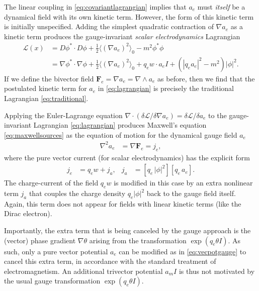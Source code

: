 \documentclass[1p,sort&compress]{elsarticle}
\numberwithin{equation}{section}
\newcommand{\bv}[1]{\mathbf{#1}}
\newcommand{\mean}[1]{\langle #1 \rangle}
\begin{document}
The linear coupling in \eqref{eq:covariantlagrangian} implies that $a_e$ must \emph{itself} be a dynamical field with its own kinetic term.  However, the form of this kinetic term is initially unspecified.  Adding the simplest quadratic contraction of $\nabla a_e$ as a kinetic term produces the gauge-invariant \emph{scalar electrodynamics} Lagrangian
\begin{align}\label{eq:lagrangian}
  \mathcal{L}(x) &= D\phi^*\cdot D\phi + \frac{1}{2}\mean{(\nabla a_e)^2}_0 - m^2 \phi^*\phi \\
  &= \nabla\phi^*\cdot \nabla\phi + \frac{1}{2}\mean{(\nabla a_e)^2}_0 + q_e w\cdot a_e I + (|q_e a_e|^2 - m^2)|\phi|^2. \nonumber
\end{align}
If we define the bivector field $\bv{F}_e = \nabla a_e = \nabla\wedge a_e$ as before, then we find that the postulated kinetic term for $a_e$ in \eqref{eq:lagrangian} is precisely the traditional Lagrangian \eqref{eq:traditional}.  

Applying the Euler-Lagrange equation $\nabla\cdot(\delta\mathcal{L}/\delta\nabla a_e) = \delta\mathcal{L}/\delta a_e$ to the gauge-invariant Lagrangian \eqref{eq:lagrangian} produces Maxwell's equation \eqref{eq:maxwellsources} as the equation of motion for the dynamical gauge field $a_e$
\begin{align}
  \nabla^2 a_e &= \nabla \bv{F}_e = j_e,
\end{align}
where the pure vector current (for scalar electrodynamics) has the explicit form
\begin{align}
  j_e &= q_e w + j_a, & j_a &= [q_e\,|\phi|^2] [q_e\,a_e].
\end{align}
The charge-current of the field $q_e w$ is modified in this case by an extra nonlinear term $j_a$ that couples the charge density $q_e|\phi|^2$ back to the gauge field itself.  Again, this term does not appear for fields with linear kinetic terms (like the Dirac electron).  

Importantly, the extra term that is being canceled by the gauge approach is the (vector) phase gradient $\nabla \theta$ arising from the transformation $\exp(q_e\theta I)$. As such, only a pure vector potential $a_e$ can be modified as in \eqref{eq:vecpotgauge} to cancel this extra term, in accordance with the standard treatment of electromagnetism.  An additional trivector potential $a_m I$ is thus not motivated by the usual gauge transformation $\exp(q_e\theta I)$.

\end{document}

